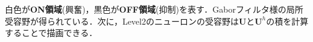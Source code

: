 白色が\textbf{ON領域}(興奮)，黒色が\textbf{OFF領域}(抑制)を表す．Gaborフィルタ様の局所受容野が得られている．次に，Level2のニューロンの受容野は$\mathbf{U}$と$\mathbf{U}^h$の積を計算することで描画できる．
